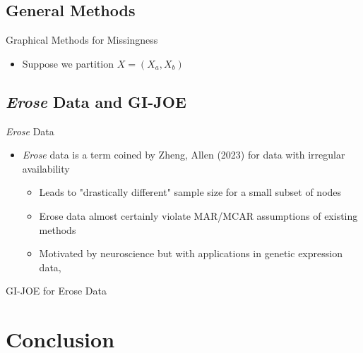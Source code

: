 \documentclass{beamer}
\begin{document}
\subsection{General Methods}

\begin{frame}{Graphical Methods for Missingness}
    \begin{itemize}
        \item Suppose we partition $X = (X_a, X_b)$
    \end{itemize}
\end{frame}

\subsection{{\it Erose} Data and GI-JOE}



\begin{frame}{{\it Erose} Data}
    \begin{itemize}
        \item {\it Erose} data is a term coined by Zheng, Allen (2023) for data with irregular availability \cite{zheng_gi-joe_2023}
        \begin{itemize}
            \item Leads to "drastically different" sample size for a small subset of nodes 
            \item Erose data almost certainly violate MAR/MCAR assumptions of existing methods 
            \item Motivated by neuroscience but with applications in genetic expression data, 
        \end{itemize}
    \end{itemize} 
\end{frame}


\begin{frame}{GI-JOE for Erose Data}
\end{frame}


\section*{Conclusion}
\end{document}

